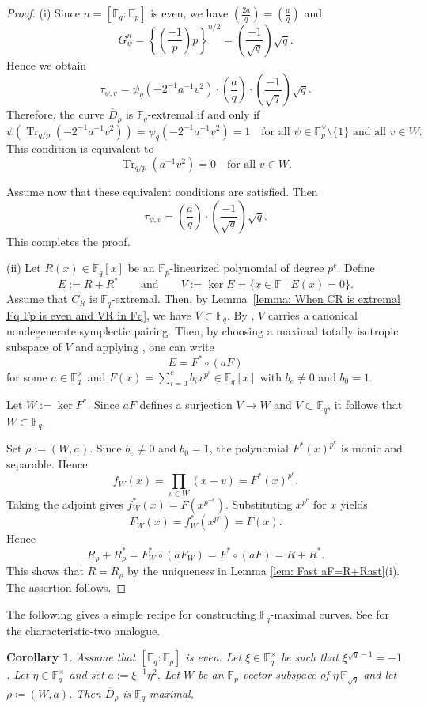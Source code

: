 \documentclass[12pt,a4paper]{amsart}
\newtheorem{corollary}[theorem]{Corollary}
\theoremstyle{definition}
\def\F{{\mathbb F}}
\theoremstyle{remark}
\DeclareMathOperator{\Tr}{Tr}
\begin{document}
\begin{proof}
(i) Since $n=[\F_q:\F_p]$ is even, we have $\displaystyle \left(\frac{2a}{q}\right) = \left(\frac{a}{q}\right)$ and 
  \[
  G_{\psi}^n=\left\{\left(\frac{-1}{p}\right)p \right\}^{n/2}=
  \left(\frac{-1}{\sqrt{q}}\right)\sqrt{q}. 
  \]
  Hence we obtain 
  \[
\tau_{\psi,v}=\psi_q(-2^{-1}a^{-1}v^2) \cdot \left(\frac{a}{q}\right) \cdot 
\left(\frac{-1}{\sqrt{q}}\right)\sqrt{q}.
  \]
  Therefore, the curve $\overline{D}_{\rho}$ is $\F_q$-extremal if and only if 
  \[
  \psi(\Tr_{q/p}(-2^{-1}a^{-1}v^2))=
  \psi_q(-2^{-1}a^{-1}v^2)=1 \quad \textrm{for all $\psi \in \F_p^{\vee} \setminus \{1\}$ and 
  all $v \in W$}. 
  \]
  This condition is equivalent to 
  \begin{equation*}\label{equation: condition for ex}
      \Tr_{q/p}(a^{-1}v^2)=0 \quad \textrm{for all $v \in W$}. 
  \end{equation*}

Assume now that these equivalent conditions are satisfied. Then 
\[
\tau_{\psi,v}=\left(\frac{a}{q}\right) \cdot 
\left(\frac{-1}{\sqrt{q}}\right)\sqrt{q}.
  \]
  This completes the proof. 
  
   
  \medskip 

  \noindent
  (ii) Let $R(x)\in\F_q[x]$ be an $\F_p$-linearized polynomial of degree $p^e$.  Define 
  \[E:=R+R^\ast\qquad\text{and}\qquad V:=
  \ker E=\{x \in\F \mid E(x)=0\}.\]
  Assume that $\overline{C}_{R}$ is $\F_q$-extremal. Then, 
  by Lemma~\ref{lemma: When CR is extremal Fq Fp is even and VR in Fq}, we have 
 $V\subset \F_q$. By \cite[Lemma~2.6]{ITT1}, $V$ carries a canonical nondegenerate symplectic pairing. 
  Then, by choosing a maximal totally isotropic subspace of $V$ 
  and applying \cite[Corollary 2.10]{ITT1}, one can write 
  \[
  E=F^\ast \circ (aF)
  \]
  for some $a\in \F_q^\times$ and $F(x)=\sum_{i=0}^eb_ix^{p^i}\in \F_q[x]$ with $b_e\neq0$ and $b_0=1$. 


  Let $W:=\ker F^\ast$. 
  Since $aF$ defines a surjection 
  $V \to W$ and $V\subset \F_q$, it follows that $W \subset \F_q$. 

Set $\rho:=(W,a)$. 
Since $b_e\neq0$ and $b_0=1$, the polynomial $F^\ast(x)^{p^e}$ is monic and separable. 
Hence 
\[
f_W(x)=\prod_{v\in W}(x-v)=F^\ast(x)^{p^e}. 
\]
Taking the adjoint gives $f_W^\ast(x)=F(x^{p^{-e}})$. 
Substituting $x^{p^e}$ for $x$ yields 
\[
F_W(x)=f_W^\ast(x^{p^e})=F(x).
\]
Hence 
\[
R_{\rho}+R_{\rho}^\ast=F_W^{\ast}\circ (a F_W)=F^\ast \circ (aF)=
R+R^\ast. 
\]
  This shows that $R=R_\rho$ by the uniqueness in Lemma \ref{lem: Fast aF=R+Rast}(i). The assertion follows. 
 \end{proof} 
The following gives a simple recipe for constructing $\F_q$-maximal curves. See \cite[Corollary 6.7]{ITT1} for the characteristic-two analogue.
\begin{corollary}\label{maxc}
Assume that $[\F_q:\F_p]$ is even. 
Let $\xi \in \F_q^{\times}$ be such that $\xi^{\sqrt{q}-1}=-1$.
Let $\eta \in \F_q^{\times}$ and set 
$a:=\xi^{-1} \eta^2$. 
Let $W$ be an $\F_p$-vector subspace of $\eta\, \F_{\sqrt{q}}$ and let $\rho \coloneqq (W,a)$. 
Then $\overline{D}_{\rho}$ is $\F_q$-maximal. 
\end{corollary}
\end{document}
